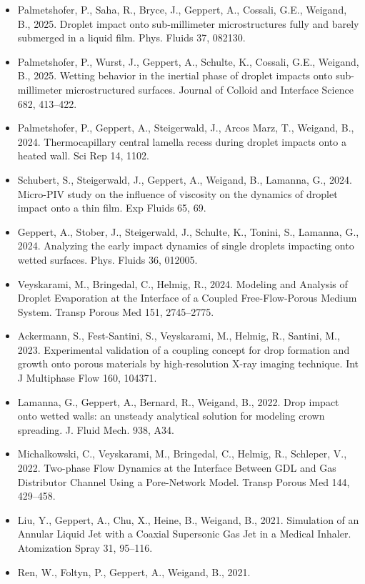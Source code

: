 \begin{itemize}
\item Palmetshofer, P., Saha, R., Bryce, J., Geppert, A., 
Cossali, G.E., Weigand, B., 2025. Droplet impact onto 
sub-millimeter microstructures fully and barely submerged in a liquid film.
Phys. Fluids 37, 082130.
\item Palmetshofer, P., Wurst, J., Geppert, A., Schulte, K., Cossali, G.E., Weigand, B., 2025. Wetting
behavior in the inertial phase of droplet impacts onto sub-millimeter microstructured surfaces. Journal
of Colloid and Interface Science 682, 413–422. 
\item Palmetshofer, P., Geppert, A., Steigerwald, J., Arcos Marz, T., Weigand, B., 2024. Thermocapillary
central lamella recess during droplet impacts onto a heated wall. Sci Rep 14, 1102.
\item Schubert, S., Steigerwald, J., Geppert, A., 
Weigand, B., Lamanna, G., 2024. Micro-PIV study on the
influence of viscosity on the dynamics of droplet 
impact onto a thin film. Exp Fluids 65, 69.
\item Geppert, A., Stober, J., Steigerwald, J., Schulte, K., Tonini, S., 
Lamanna, G., 2024. Analyzing the early impact dynamics of single 
droplets impacting onto wetted surfaces. Phys.  Fluids 36, 012005.
\item Veyskarami, M., Bringedal, C., Helmig, R., 2024. Modeling and 
Analysis of Droplet Evaporation at the Interface of a Coupled 
Free-Flow-Porous Medium System. Transp Porous Med 151, 2745–2775.
\item Ackermann, S., Fest-Santini, S., Veyskarami, M., Helmig, R., 
Santini, M., 2023. Experimental validation of a coupling 
concept for drop formation and growth onto porous materials 
by high-resolution X-ray imaging technique. Int J Multiphase Flow 160, 104371. 
\item Lamanna, G., Geppert, A., Bernard, R., Weigand, B., 2022. 
 Drop impact onto wetted walls: an unsteady analytical 
 solution for modeling crown spreading. J. Fluid Mech. 938, A34.
\item Michalkowski, C., Veyskarami, M., Bringedal, C., Helmig, R., 
Schleper, V., 2022. Two-phase Flow Dynamics at the Interface Between 
GDL and Gas Distributor Channel Using a Pore-Network Model. 
Transp Porous Med 144, 429–458. 
\item Liu, Y., Geppert, A., Chu, X., Heine, B., Weigand, B., 2021. 
Simulation of an Annular Liquid
Jet with a Coaxial Supersonic Gas Jet in a 
Medical Inhaler. Atomization Spray 31, 95–116.
\item Ren, W., Foltyn, P., Geppert, A., Weigand, B., 2021. 

\end{itemize}

